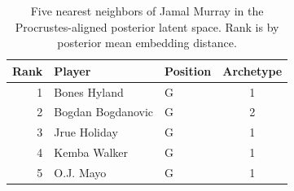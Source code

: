 \begin{table}[htbp]
  \centering\small
  \begin{tabular}{rllc}
    \toprule
    Rank & Player & Position & Archetype \\
    \midrule
    1 & Bones Hyland & G & 1 \\
    2 & Bogdan Bogdanovic & G & 2 \\
    3 & Jrue Holiday & G & 1 \\
    4 & Kemba Walker & G & 1 \\
    5 & O.J. Mayo & G & 1 \\
    \bottomrule
  \end{tabular}
  \caption{Five nearest neighbors of Jamal Murray in the Procrustes-aligned posterior latent space. Rank is by posterior mean embedding distance.}
  \label{tab:Jamal_Murray_neighbors}
\end{table}

